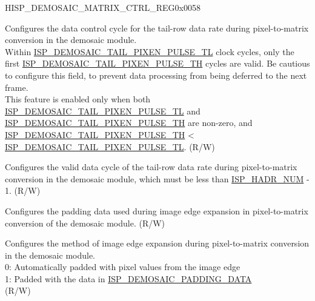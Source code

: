 \begin{register}{H}{ISP\_DEMOSAIC\_MATRIX\_CTRL\_REG}{0x0058}\label{regdesc:ISPDEMOSAICMATRIXCTRLREG}
%
%
%
%
%
\regnewline%
\begin{regdesc}\begin{reglist}
\label{fielddesc:ISPDEMOSAICTAILPIXENPULSETL}\item [ISP\_DEMOSAIC\_TAIL\_PIXEN\_PULSE\_TL] Configures the data control cycle for the tail-row data rate during pixel-to-matrix conversion in the demosaic module.\\Within \hyperref[fielddesc:ISPDEMOSAICTAILPIXENPULSETL]{ISP\_DEMOSAIC\_TAIL\_PIXEN\_PULSE\_TL} clock cycles, only the first \hyperref[fielddesc:ISPDEMOSAICTAILPIXENPULSETH]{ISP\_DEMOSAIC\_TAIL\_PIXEN\_PULSE\_TH} cycles are valid. Be cautious to configure this field, to prevent data processing from being deferred to the next frame.\\This feature is enabled only when both \hyperref[fielddesc:ISPDEMOSAICTAILPIXENPULSETL]{ISP\_DEMOSAIC\_TAIL\_PIXEN\_PULSE\_TL} and \hyperref[fielddesc:ISPDEMOSAICTAILPIXENPULSETH]{ISP\_DEMOSAIC\_TAIL\_PIXEN\_PULSE\_TH} are non-zero, and \hyperref[fielddesc:ISPDEMOSAICTAILPIXENPULSETH]{ISP\_DEMOSAIC\_TAIL\_PIXEN\_PULSE\_TH} < \hyperref[fielddesc:ISPDEMOSAICTAILPIXENPULSETL]{ISP\_DEMOSAIC\_TAIL\_PIXEN\_PULSE\_TL}. (R/W)
\label{fielddesc:ISPDEMOSAICTAILPIXENPULSETH}\item [ISP\_DEMOSAIC\_TAIL\_PIXEN\_PULSE\_TH] Configures the valid data cycle of the tail-row data rate during pixel-to-matrix conversion in the demosaic module, which must be less than \hyperref[fielddesc:ISPHADRNUM]{ISP\_HADR\_NUM} - 1. (R/W)
\label{fielddesc:ISPDEMOSAICPADDINGDATA}\item [ISP\_DEMOSAIC\_PADDING\_DATA] Configures the padding data used during image edge expansion in pixel-to-matrix conversion of the demosaic module. (R/W)
\label{fielddesc:ISPDEMOSAICPADDINGMODE}\item [ISP\_DEMOSAIC\_PADDING\_MODE] Configures the method of image edge expansion during pixel-to-matrix conversion in the demosaic module.\\0: Automatically padded with pixel values from the image edge\\1: Padded with the data in \hyperref[fielddesc:ISPDEMOSAICPADDINGDATA]{ISP\_DEMOSAIC\_PADDING\_DATA}\\(R/W)
\end{reglist}\end{regdesc}
\end{register}


